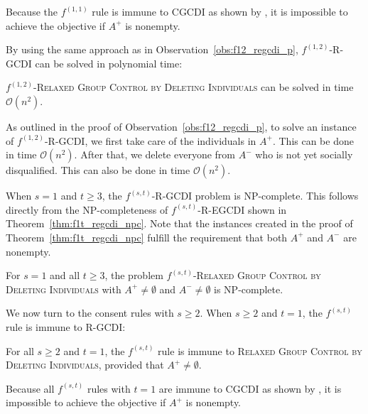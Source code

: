 \documentclass[
    12pt,               %
    a4paper,            %
    bibtotoc,           %
    pointlessnumbers,   %
    ngerman,            %
    titlepage,          %
    leqno,              %
    ]{scrarticle}       %
\newcommand\thmref{Theorem~\ref}
\newcommand\obsref{Observation~\ref}
\begin{document}
\begin{Proof}
Because the $f^{(1, 1)}$ rule is immune to CGCDI as shown by \textcite[Theorem 1]{YD18}, it is impossible to achieve the objective if $A^+$ is nonempty.
\end{Proof}



By using the same approach as in \obsref{obs:f12_regcdi_p}, $f^{(1, 2)}$-R-GCDI can be solved in polynomial time:

\begin{Observation} \label{obs:f12_rgcdi_p}
$f^{(1, 2)}$-\textsc{Relaxed Group Control by Deleting Individuals} can be solved in time $\mathcal{O}(n^2)$.
\end{Observation}

\begin{Proof}
As outlined in the proof of \obsref{obs:f12_regcdi_p}, to solve an instance of $f^{(1, 2)}$-R-GCDI, we first take care of the individuals in $A^+$. This can be done in time $\mathcal{O}(n^2)$. After that, we delete everyone from $A^-$ who is not yet socially disqualified. This can also be done in time $\mathcal{O}(n^2)$.
\end{Proof}



When $s=1$ and $t \geq 3$, the $f^{(s, t)}$-R-GCDI problem is NP-complete. This follows directly from the NP-completeness of $f^{(s, t)}$-R-EGCDI shown in \thmref{thm:f1t_regcdi_npc}. Note that the instances created in the proof of \thmref{thm:f1t_regcdi_npc} fulfill the requirement that both $A^+$ and $A^-$ are nonempty.

\begin{Corollary} \label{cor:f1t_rgcdi_npc}
For $s=1$ and all $t \geq 3$, the problem $f^{(s, t)}$-\textsc{Relaxed Group Control by Deleting Individuals} with $A^+ \neq \emptyset$ and $A^- \neq \emptyset$ is NP-complete.
\end{Corollary}



We now turn to the consent rules with $s \geq 2$. When $s \geq 2$ and $t=1$, the $f^{(s, t)}$ rule is immune to R-GCDI:

\begin{Observation} \label{obs:f21_rgcdi_i}
For all $s \geq 2$ and $t=1$, the $f^{(s, t)}$ rule is immune to \textsc{Relaxed Group Control by Deleting Individuals}, provided that $A^+ \neq \emptyset$.
\end{Observation}

\begin{Proof}
Because all $f^{(s, t)}$ rules with $t=1$ are immune to CGCDI as shown by \textcite[Theorem 2]{YD18}, it is impossible to achieve the objective if $A^+$ is nonempty.
\end{Proof}
\end{document}
